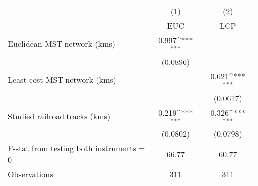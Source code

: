 {
\def\sym#1{\ifmmode^{#1}\else\(^{#1}\)\fi}
\begin{tabular}{l*{2}{c}}
\hline\hline
                &\multicolumn{1}{c}{(1)}&\multicolumn{1}{c}{(2)}\\
                &\multicolumn{1}{c}{EUC}&\multicolumn{1}{c}{LCP}\\
\hline
Euclidean MST network (kms)&    0.997\sym{***}&                  \\
                & (0.0896)         &                  \\
[1em]
Least-cost MST network (kms)&                  &    0.621\sym{***}\\
                &                  & (0.0617)         \\
[1em]
Studied railroad tracks (kms)&    0.219\sym{***}&    0.326\sym{***}\\
                & (0.0802)         & (0.0798)         \\
\hline
F-stat from testing both instruments = 0&    66.77         &    60.77         \\
Observations    &      311         &      311         \\
\hline\hline
\end{tabular}
}
